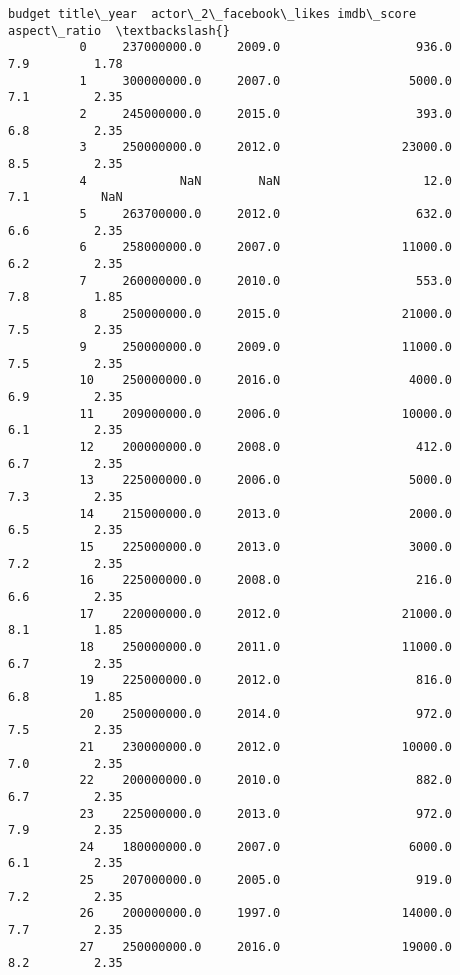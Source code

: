 \documentclass[11pt]{article}
\begin{document}
\begin{Verbatim}[commandchars=\\\{\}]
                     budget title\_year  actor\_2\_facebook\_likes imdb\_score aspect\_ratio  \textbackslash{}
          0     237000000.0     2009.0                   936.0        7.9         1.78   
          1     300000000.0     2007.0                  5000.0        7.1         2.35   
          2     245000000.0     2015.0                   393.0        6.8         2.35   
          3     250000000.0     2012.0                 23000.0        8.5         2.35   
          4             NaN        NaN                    12.0        7.1          NaN   
          5     263700000.0     2012.0                   632.0        6.6         2.35   
          6     258000000.0     2007.0                 11000.0        6.2         2.35   
          7     260000000.0     2010.0                   553.0        7.8         1.85   
          8     250000000.0     2015.0                 21000.0        7.5         2.35   
          9     250000000.0     2009.0                 11000.0        7.5         2.35   
          10    250000000.0     2016.0                  4000.0        6.9         2.35   
          11    209000000.0     2006.0                 10000.0        6.1         2.35   
          12    200000000.0     2008.0                   412.0        6.7         2.35   
          13    225000000.0     2006.0                  5000.0        7.3         2.35   
          14    215000000.0     2013.0                  2000.0        6.5         2.35   
          15    225000000.0     2013.0                  3000.0        7.2         2.35   
          16    225000000.0     2008.0                   216.0        6.6         2.35   
          17    220000000.0     2012.0                 21000.0        8.1         1.85   
          18    250000000.0     2011.0                 11000.0        6.7         2.35   
          19    225000000.0     2012.0                   816.0        6.8         1.85   
          20    250000000.0     2014.0                   972.0        7.5         2.35   
          21    230000000.0     2012.0                 10000.0        7.0         2.35   
          22    200000000.0     2010.0                   882.0        6.7         2.35   
          23    225000000.0     2013.0                   972.0        7.9         2.35   
          24    180000000.0     2007.0                  6000.0        6.1         2.35   
          25    207000000.0     2005.0                   919.0        7.2         2.35   
          26    200000000.0     1997.0                 14000.0        7.7         2.35   
          27    250000000.0     2016.0                 19000.0        8.2         2.35   

\end{Verbatim}
\end{document}
